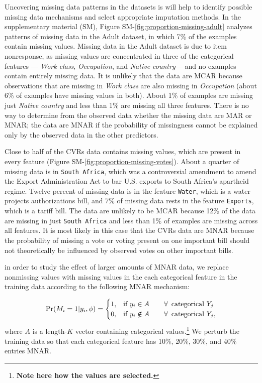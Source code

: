 \documentclass[10pt]{book}
\theoremstyle{definition}
\begin{document}
Uncovering missing data patterns in the datasets is will help to identify possible missing data mechanisms and select appropriate imputation methods. In the supplementary material (SM), Figure SM-\ref{fig:proportion-missing-adult} analyzes patterns of missing data in the Adult dataset, in which 7\% of the examples contain missing values. Missing data in the Adult dataset is due to item nonresponse, as missing values are concentrated in three of the categorical features --- \emph{Work class}, \emph{Occupation}, and \emph{Native country}--- and no examples contain entirely missing data. It is unlikely that the data are MCAR because observations that are missing in \emph{Work class} are also missing in \emph{Occupation} (about 6\% of examples have missing values in both). About 1\% of examples are missing just \emph{Native country} and less than 1\% are missing all three features. There is no way to determine from the observed data whether the missing data are MAR or MNAR; the data are MNAR if the probability of missingness cannot be explained only by the observed data in the other predictors.

Close to half of the CVRs data contains missing values, which are present in every feature (Figure SM-\ref{fig:proportion-missing-votes}). About a quarter of missing data is in \texttt{South Africa}, which was a controversial amendment to amend the Export Administration Act to bar U.S. exports to South Africa's apartheid regime. Twelve percent of missing data is in the feature \texttt{Water}, which is a water projects authorizations bill, and 7\% of missing data rests in the feature \texttt{Exports}, which is a tariff bill. The data are unlikely to be MCAR because 12\% of the data are missing in just \texttt{South Africa} and less than 1\% of examples are missing across all features. It is most likely in this case that the CVRs data are MNAR because the probability of missing a vote or voting present on one important bill should not theoretically be influenced by observed votes on other important bills. 

\par
{}

 in order to study the effect of larger amounts of MNAR data, we replace nonmissing values with missing values in the each categorical feature in the training data according to the following MNAR mechanism:
 
 \begin{equation}\label{3.1}
\Pr (M_i = 1 | y_i, \phi) = \begin{cases}
1, &\text{if $y_i \in A$ \hspace{5mm} $\forall \,$ categorical $Y_j$} \\
0, &\text{if $y_i \notin A$ \hspace{5mm} $\forall \,$ categorical $Y_j$},
\end{cases}
\end{equation} where $A$ is a length-$K$ vector containing categorical values.\footnote{\textbf{Note here how the values are selected.}}  We perturb the training data so that each categorical feature has 10\%, 20\%, 30\%, and 40\% entries MNAR. 
\end{document}
